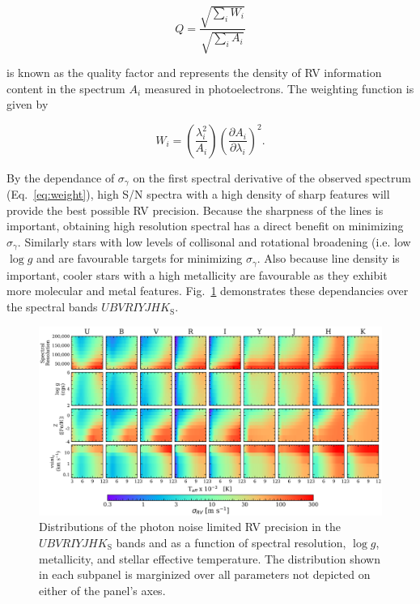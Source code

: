 \begin{equation}
  Q = \frac{\sqrt{\sum_i W_i}}{\sqrt{\sum_i A_i}}
\end{equation}

\noindent is known as the quality factor and represents the density of RV information content
in the spectrum $A_i$ measured in photoelectrons. The weighting function is given by

\begin{equation}
  W_i = \left( \frac{\lambda_i^2}{A_i} \right) \left( \frac{\partial A_i}{\partial \lambda_i} \right)^2.
  \label{eq:weight}
\end{equation}

By the dependance of $\sigma_{\gamma}$ on the first spectral derivative of the observed spectrum
(Eq.~\ref{eq:weight}), high S/N spectra with a high density of sharp features will provide the
best possible RV precision. Because the sharpness of the lines is important, obtaining high
resolution spectral has a direct benefit on minimizing $\sigma_{\gamma}$. Similarly stars
with low levels of collisonal and rotational broadening (i.e. low $\log{g}$ and \vsini{)} are
favourable targets for minimizing $\sigma_{\gamma}$. Also because line density is important, cooler stars
with a high metallicity are favourable as they exhibit more molecular and metal features.
Fig.~\ref{fig:sigrv} demonstrates these dependancies over the spectral
bands $UBVRIYJHK_{\text{S}}$.

\begin{figure}
  \centering
  \includegraphics[width=\textwidth]{figures/sigRV_grid.png}
  \caption{Distributions of the photon noise limited RV precision in the $UBVRIYJHK_{\text{S}}$
    bands and as a function of spectral resolution, $\log{g}$, metallicity, \vsini{,}
    and stellar effective temperature. The distribution shown in each subpanel is marginized
    over all parameters not depicted on either of the panel's axes.}
  \label{fig:sigrv}
\end{figure}

